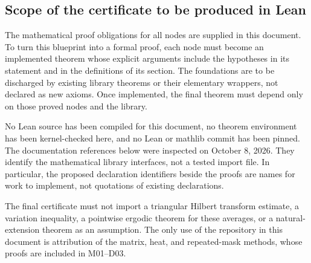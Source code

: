\documentclass[11pt]{article}
\theoremstyle{remark}\newtheorem{remark}[theorem]{Remark}
\begin{document}
\subsection{Scope of the certificate to be produced in Lean}
The mathematical proof obligations for all nodes are supplied in this document. To turn this blueprint into a formal proof, each node must become an implemented theorem whose explicit arguments include the hypotheses in its statement and in the definitions of its section. The foundations are to be discharged by existing library theorems or their elementary wrappers, not declared as new axioms. Once implemented, the final theorem must depend only on those proved nodes and the library.

No Lean source has been compiled for this document, no theorem environment has been kernel-checked here, and no Lean or mathlib commit has been pinned. The documentation references below were inspected on October 8, 2026. They identify the mathematical library interfaces, not a tested import file. In particular, the proposed declaration identifiers beside the proofs are names for work to implement, not quotations of existing declarations.

The final certificate must not import a triangular Hilbert transform estimate, a variation inequality, a pointwise ergodic theorem for these averages, or a natural-extension theorem as an assumption. The only use of the repository in this document is attribution of the matrix, heat, and repeated-mask methods, whose proofs are included in M01--D03.
\end{document}
